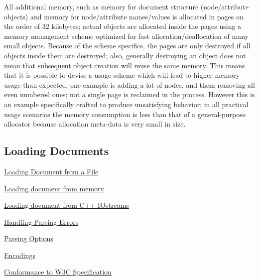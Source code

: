  \par
 All additional memory, such as memory for document structure (node/attribute objects) and memory for node/attribute names/values is allocated in pages on the order of 32 kilobytes; actual objects are allocated inside the pages using a memory management scheme optimized for fast allocation/deallocation of many small objects. Because of the scheme specifics, the pages are only destroyed if all objects inside them are destroyed; also, generally destroying an object does not mean that subsequent object creation will reuse the same memory. This means that it is possible to devise a usage scheme which will lead to higher memory usage than expected; one example is adding a lot of nodes, and them removing all even numbered ones; not a single page is reclaimed in the process. However this is an example specifically crafted to produce unsatisfying behavior; in all practical usage scenarios the memory consumption is less than that of a general-\/purpose allocator because allocation meta-\/data is very small in size. \par
 \par
 \hypertarget{XMLManual_XMLLoading}{}\subsection{Loading Documents}\label{XMLManual_XMLLoading}

\begin{DoxyItemize}
\item \hyperlink{XMLManual_XMLLoadingFiles}{Loading Document from a File}
\item \hyperlink{XMLManual_XMLLoadingFromMemory}{Loading document from memory}
\item \hyperlink{XMLManual_XMLLoadingStreams}{Loading document from C++ IOstreams}
\item \hyperlink{XMLManual_XMLLoadingErrors}{Handling Parsing Errors}
\item \hyperlink{XMLManual_XMLLoadingParsingOptions}{Parsing Options}
\item \hyperlink{XMLManual_XMLLoadingEncodings}{Encodings}
\item \hyperlink{XMLManual_XMLLoadingStandards}{Conformance to W3C Specification}
\end{DoxyItemize}

